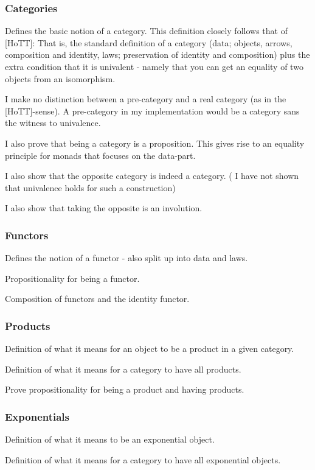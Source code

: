 \subsubsection{Categories}
Defines the basic notion of a category. This definition closely follows that of
[HoTT]: That is, the standard definition of a category (data; objects, arrows,
composition and identity, laws; preservation of identity and composition) plus
the extra condition that it is univalent - namely that you can get an equality
of two objects from an isomorphism.

I make no distinction between a pre-category and a real category (as in the
[HoTT]-sense). A pre-category in my implementation would be a category sans the
witness to univalence.

I also prove that being a category is a proposition. This gives rise to an
equality principle for monads that focuses on the data-part.

I also show that the opposite category is indeed a category. (\WIP{} I have not
shown that univalence holds for such a construction)

I also show that taking the opposite is an involution.

\subsubsection{Functors}
Defines the notion of a functor - also split up into data and laws.

Propositionality for being a functor.

Composition of functors and the identity functor.

\subsubsection{Products}
Definition of what it means for an object to be a product in a given category.

Definition of what it means for a category to have all products.

\WIP Prove propositionality for being a product and having products.

\subsubsection{Exponentials}
Definition of what it means to be an exponential object.

Definition of what it means for a category to have all exponential objects.

